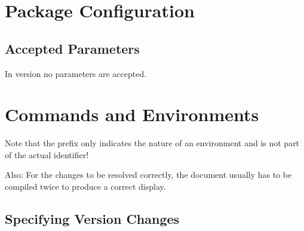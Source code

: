 \documentclass{sopra-base}
\begin{document}
\section{Package Configuration}
    \subsection{Accepted Parameters}
    In version \thesocversion{} no parameters are accepted.

%
%
%
%

\section{Commands and Environments}

Note that the prefix  only indicates the nature of an environment and is not part of the actual identifier!\par{}
Also: For the changes to be resolved correctly, the document
usually has to be compiled twice to produce a correct display.

\subsection{Specifying Version Changes}
\end{document}
